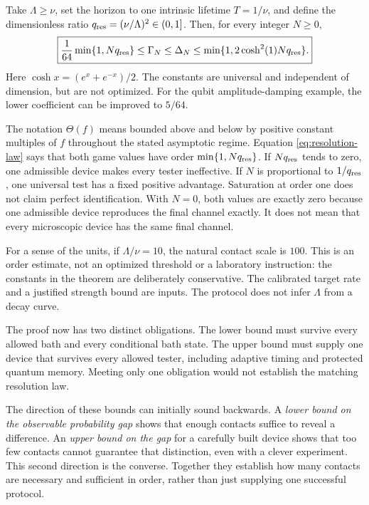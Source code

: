 \documentclass[11pt,a4paper]{article}
\numberwithin{equation}{section}
\theoremstyle{remark}
\begin{document}
Take $\Lambda\ge\nu$, set the horizon to one intrinsic lifetime
$T=1/\nu$, and define the dimensionless ratio
$q_{\rm res}=(\nu/\Lambda)^2\in(0,1]$. Then, for every integer $N\ge0$,
\begin{equation}
 \boxed{\frac1{64}\min\{1,Nq_{\rm res}\}
 \le\Gamma_N\le\Delta_N
 \le\min\{1,2\cosh^2(1)Nq_{\rm res}\}.}
 \label{eq:resolution-law}
\end{equation}
Here $\cosh x=(e^x+e^{-x})/2$. The constants are universal and independent
of dimension, but are not optimized. For the qubit amplitude-damping
example, the lower coefficient can be improved to $5/64$.

The notation $\Theta(f)$ means bounded above and below by positive constant
multiples of $f$ throughout the stated asymptotic regime. Equation
\eqref{eq:resolution-law} says that both game values have order
$\min\{1,Nq_{\rm res}\}$. If $Nq_{\rm res}$ tends to zero, one admissible device makes every
tester ineffective. If $N$ is proportional to $1/q_{\rm res}$, one universal test
has a fixed positive advantage. Saturation at order one does not claim
perfect identification. With $N=0$, both values are exactly zero because
one admissible device reproduces the final channel exactly. It does not
mean that every microscopic device has the same final channel.

For a sense of the units, if $\Lambda/\nu=10$, the natural contact scale is
$100$. This is an order estimate, not an optimized threshold or a
laboratory instruction: the constants in the theorem are deliberately
conservative. The calibrated target rate and a justified strength bound
are inputs. The protocol does not infer $\Lambda$ from a decay curve.

The proof now has two distinct obligations. The lower bound must survive
every allowed bath and every conditional bath state. The upper bound must
supply one device that survives every allowed tester, including adaptive
timing and protected quantum memory. Meeting only one obligation would
not establish the matching resolution law.

The direction of these bounds can initially sound backwards.
A \emph{lower bound on the observable probability gap} shows that enough
contacts suffice to reveal a difference. An \emph{upper bound on the gap}
for a carefully built device shows that too few contacts cannot guarantee
that distinction, even with a clever experiment. This second direction is
the converse. Together they establish how many contacts are necessary
and sufficient in order, rather than just supplying one successful protocol.
\end{document}

